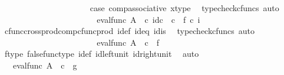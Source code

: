 \begin{isabellebody}
\ \ \ \ \ \ \ \ \ \ \ \ \ \ \ \ \ \ \ \ \isamarkupfalse%
\ case{}\ comp{\isacharunderscore}{\kern0pt}associative{}\ x{\isacharunderscore}{\kern0pt}type\ \isamarkupfalse%
\ {\isacharparenleft}{\kern0pt}typecheck{\isacharunderscore}{\kern0pt}cfuncs{\isacharcomma}{\kern0pt}\ auto{\isacharparenright}{\kern0pt}\isanewline
\ \ \ \ \ \ \ \ \ \ \ \ \ \ \ \ \ \ \isamarkupfalse%
\ \isamarkupfalse%
\ {\isachardoublequoteopen}{\isachardot}{\kern0pt}{\isachardot}{\kern0pt}{\isachardot}{\kern0pt}\ {\isacharequal}{\kern0pt}\ eval{\isacharunderscore}{\kern0pt}func\ A\ {\isasymOmega}\ {\isasymcirc}\isactrlsub c\ {\isasymlangle}id\isactrlsub c\ {\isasymOmega}\ {\isasymcirc}\isactrlsub c\ \ {\isasymf}{\isacharcomma}{\kern0pt}f\ {\isasymcirc}\isactrlsub c\ i{\isasymrangle}{\isachardoublequoteclose}\isanewline
\ \ \ \ \ \ \ \ \ \ \ \ \ \ \ \ \ \ \ \ \isamarkupfalse%
\ cfunc{\isacharunderscore}{\kern0pt}cross{\isacharunderscore}{\kern0pt}prod{\isacharunderscore}{\kern0pt}comp{\isacharunderscore}{\kern0pt}cfunc{\isacharunderscore}{\kern0pt}prod\ i{\isacharunderscore}{\kern0pt}def\ id{}{\isacharunderscore}{\kern0pt}eq\ id{}{\isacharunderscore}{\kern0pt}is\ \isamarkupfalse%
\ {\isacharparenleft}{\kern0pt}typecheck{\isacharunderscore}{\kern0pt}cfuncs{\isacharcomma}{\kern0pt}\ auto{\isacharparenright}{\kern0pt}\isanewline
\ \ \ \ \ \ \ \ \ \ \ \ \ \ \ \ \ \ \isamarkupfalse%
\ \isamarkupfalse%
\ {\isachardoublequoteopen}{\isachardot}{\kern0pt}{\isachardot}{\kern0pt}{\isachardot}{\kern0pt}\ {\isacharequal}{\kern0pt}\ eval{\isacharunderscore}{\kern0pt}func\ A\ {\isasymOmega}\ {\isasymcirc}\isactrlsub c\ {\isasymlangle}{\isasymf}{\isacharcomma}{\kern0pt}\ f\ {\isasymrangle}{\isachardoublequoteclose}\isanewline
\ \ \ \ \ \ \ \ \ \ \ \ \ \ \ \ \ \ \ \ \isamarkupfalse%
\ f{\isacharunderscore}{\kern0pt}type\ false{\isacharunderscore}{\kern0pt}func{\isacharunderscore}{\kern0pt}type\ i{\isacharunderscore}{\kern0pt}def\ id{\isacharunderscore}{\kern0pt}left{\isacharunderscore}{\kern0pt}unit{}\ id{\isacharunderscore}{\kern0pt}right{\isacharunderscore}{\kern0pt}unit{}\ \isamarkupfalse%
\ auto\isanewline
\ \ \ \ \ \ \ \ \ \ \ \ \ \ \ \ \ \ \isamarkupfalse%
\ \isamarkupfalse%
\ {\isachardoublequoteopen}{\isachardot}{\kern0pt}{\isachardot}{\kern0pt}{\isachardot}{\kern0pt}\ {\isacharequal}{\kern0pt}\ eval{\isacharunderscore}{\kern0pt}func\ A\ {\isasymOmega}\ {\isasymcirc}\isactrlsub c\ {\isasymlangle}{\isasymf}{\isacharcomma}{\kern0pt}\ g{\isasymrangle}{\isachardoublequoteclose}\isanewline

\end{isabellebody}
